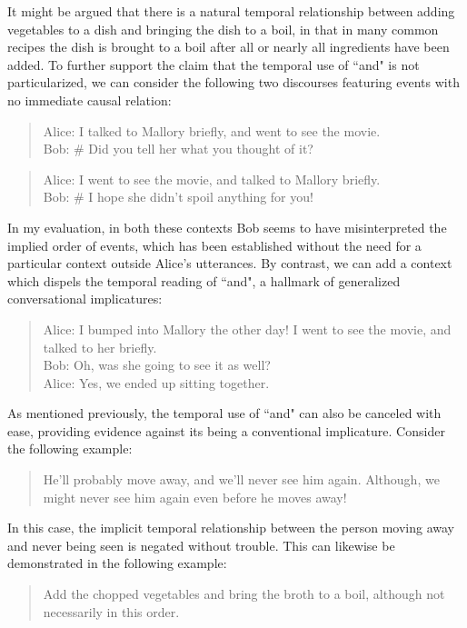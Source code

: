 \documentclass[12pt,a4paper]{article}
\begin{document}
\begin{enumerate}
It might be argued that there is a natural temporal relationship between adding vegetables to a dish and bringing the dish to a boil, in that in many common recipes the dish is brought to a boil after all or nearly all ingredients have been added. To further support the claim that the temporal use of ``and" is not particularized, we can consider the following two discourses featuring events with no immediate causal relation:
\begin{quote}
Alice: I talked to Mallory briefly, and went to see the movie.\\
Bob: \# Did you tell her what you thought of it?
\end{quote}
\begin{quote}
Alice: I went to see the movie, and talked to Mallory briefly.\\
Bob: \# I hope she didn't spoil anything for you!
\end{quote}
In my evaluation, in both these contexts Bob seems to have misinterpreted the implied order of events, which has been established without the need for a particular context outside Alice's utterances. By contrast, we can add a context which dispels the temporal reading of ``and", a hallmark of generalized conversational implicatures:
\begin{quote}
Alice: I bumped into Mallory the other day! I went to see the movie, and talked to her briefly.\\
Bob: Oh, was she going to see it as well?\\
Alice: Yes, we ended up sitting together.
\end{quote}

As mentioned previously, the temporal use of ``and" can also be canceled with ease, providing evidence against its being a conventional implicature. Consider the following example:
\begin{quote}
He'll probably move away, and we'll never see him again. Although, we might never see him again even before he moves away!
\end{quote}
In this case, the implicit temporal relationship between the person moving away and never being seen is negated without trouble. This can likewise be demonstrated in the following example:
\begin{quote}
Add the chopped vegetables and bring the broth to a boil, although not necessarily in this order.
\end{quote}

\end{enumerate}
\end{document}
